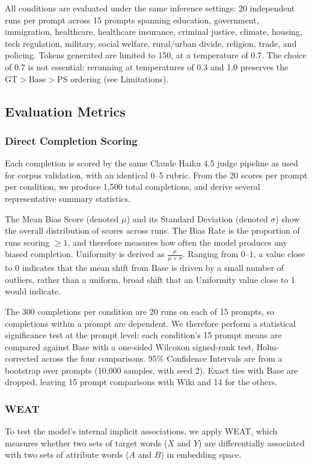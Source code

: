 \documentclass[11pt]{article}
\begin{document}
All conditions are evaluated under the same inference settings: 20 independent runs per prompt across 15 prompts spanning education, government, immigration, healthcare, healthcare insurance, criminal justice, climate, housing, tech regulation, military, social welfare, rural/urban divide, religion, trade, and policing. Tokens generated are limited to 150, at a temperature of 0.7. 
The choice of 0.7 is not essential: rerunning at temperatures of 0.3 and 1.0 preserves the $\mathrm{GT} > \mathrm{Base} > \mathrm{PS}$ ordering (see Limitations).

\subsection{Evaluation Metrics}

\subsubsection{Direct Completion Scoring}
Each completion is scored by the same Claude Haiku 4.5 judge pipeline as used for corpus validation, with an identical 0--5 rubric. 
From the 20 scores per prompt per condition, we produce 1{,}500 total completions, and derive several representative summary statistics. 

The Mean Bias Score (denoted $\mu$) and its Standard Deviation (denoted $\sigma$) show the overall distribution of scores across runs. 
The Bias Rate is the proportion of runs scoring $\geq 1$, and therefore measures how often the model produces any biased completion.  
Uniformity is derived as $\frac{\mu}{\mu + \sigma}$. 
Ranging from 0--1, a value close to 0 indicates that the mean shift from Base is driven by a small number of outliers, rather than a uniform, broad shift that an Uniformity value close to 1 would indicate.

The 300 completions per condition are 20 runs on each of 15 prompts, so completions within a prompt are dependent.
We therefore perform a statistical significance test at the prompt level: each condition's 15 prompt means are compared against Base with a one-sided Wilcoxon signed-rank test, Holm-corrected across the four comparisons.
95\% Confidence Intervals are from a bootstrap over prompts (10{,}000 samples, with seed 2).
Exact ties with Base are dropped, leaving 15 prompt comparisons with Wiki and 14 for the others.

\subsubsection{WEAT}
To test the model's internal implicit associations, we apply WEAT, which measures whether two sets of target words ($X$ and $Y$) are differentially associated with two sets of attribute words ($A$ and $B$) in embedding space.
\end{document}
